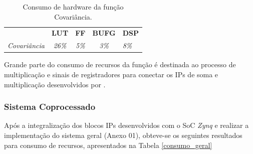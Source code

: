 \begin{table}[!h]
	\centering
	\caption{Consumo de hardware da função Covariância.}
	\label{consumo_cov}
	\begin{tabular}{ccccl}
		\textbf{}         & \textbf{LUT}  & \textbf{FF}  & \textbf{BUFG} & \textbf{DSP} \\
		\textit{Covariância} & \textit{26\%} & \textit{5\%} & \textit{3\%}  & \textit{8\%}
	\end{tabular}
\end{table}

Grande parte do consumo de recursos da função é destinada ao processo de multiplicação e sinais de registradores para conectar os IPs de soma e multiplicação desenvolvidos por \cite{munoz2010tradeoff}.

\subsubsection{Sistema Coprocessado}

Após a integralização dos blocos IPs desenvolvidos com o SoC \textit{Zynq} e realizar a implementação do sistema geral (Anexo 01), obteve-se os seguintes resultados para consumo de recursos, apresentados na Tabela \ref{consumo_geral}

